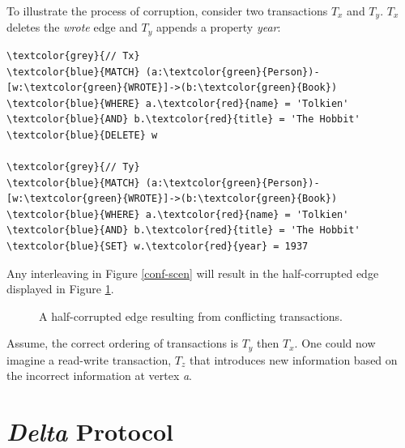 \documentclass[sigplan,10pt]{acmart}
\begin{document}
To illustrate the process of corruption, consider two transactions $T_x$ and $T_y$. $T_x$ deletes the \emph{wrote} edge and $T_y$ appends a property \emph{year}:
\begin{Verbatim}[commandchars=\\\{\},fontsize=\small,xleftmargin=.2in]
\textcolor{grey}{// Tx}
\textcolor{blue}{MATCH} (a:\textcolor{green}{Person})-[w:\textcolor{green}{WROTE}]->(b:\textcolor{green}{Book})
\textcolor{blue}{WHERE} a.\textcolor{red}{name} = 'Tolkien' \textcolor{blue}{AND} b.\textcolor{red}{title} = 'The Hobbit'
\textcolor{blue}{DELETE} w

\textcolor{grey}{// Ty}
\textcolor{blue}{MATCH} (a:\textcolor{green}{Person})-[w:\textcolor{green}{WROTE}]->(b:\textcolor{green}{Book})
\textcolor{blue}{WHERE} a.\textcolor{red}{name} = 'Tolkien' \textcolor{blue}{AND} b.\textcolor{red}{title} = 'The Hobbit'
\textcolor{blue}{SET} w.\textcolor{red}{year} = 1937
\end{Verbatim}
Any interleaving in Figure \ref{conf-scen} will result in the half-corrupted edge displayed in Figure \ref{half-corrupted}.

\begin{figure}[H]
  \centering
  \caption{A half-corrupted edge resulting from conflicting transactions.}
  \label{half-corrupted}
\end{figure}

Assume, the correct ordering of transactions is $T_y$ then $T_x$. One could now imagine a read-write transaction, $T_z$ that introduces new information based on the incorrect information at vertex \emph{a}.

\section{\emph{Delta} Protocol}
\end{document}
